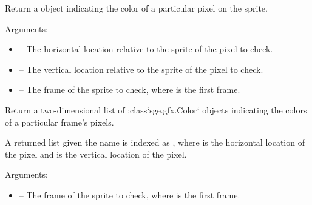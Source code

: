 \documentclass[letterpaper,10pt,english]{sphinxmanual}
\begin{document}

\begin{fulllineitems}
\label{gfx:sge.gfx.Sprite.get_pixel}
Return a {\hyperref[gfx:sge.gfx.Color]{\emph{}}} object indicating the color of a
particular pixel on the sprite.

Arguments:
\begin{itemize}
\item {} 
 -- The horizontal location relative to the sprite of the
pixel to check.

\item {} 
 -- The vertical location relative to the sprite of the
pixel to check.

\item {} 
 -- The frame of the sprite to check, where  is
the first frame.

\end{itemize}

\end{fulllineitems}


\begin{fulllineitems}
\label{gfx:sge.gfx.Sprite.get_pixels}
Return a two-dimensional list of :class{}`sge.gfx.Color{}` objects
indicating the colors of a particular frame's pixels.

A returned list given the name  is indexed as
, where  is the horizontal location of the
pixel and  is the vertical location of the pixel.

Arguments:
\begin{itemize}
\item {} 
 -- The frame of the sprite to check, where  is
the first frame.

\end{itemize}

\end{fulllineitems}

\end{document}
